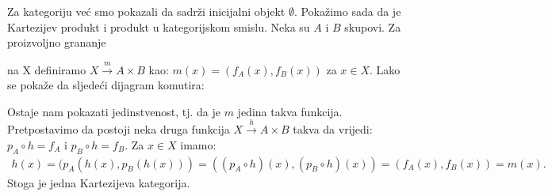 \begin{example}
    \noindent Za kategoriju  već smo pokazali da sadrži inicijalni objekt
    $\emptyset$.
    Pokažimo sada da je Kartezijev produkt i produkt u kategorijskom smislu.
    Neka su $A$ i $B$ skupovi.
    Za proizvoljno grananje
    \begin{center}
    \end{center}
    na X definiramo $X \xrightarrow{m} A \times B$ kao:
      $m(x) = (f_A(x), f_B(x))$
    za $x \in X$. Lako se pokaže da sljedeći dijagram komutira:
  \begin{center}
  \end{center}
  Ostaje nam pokazati jedinstvenost, tj. da je $m$ jedina takva funkcija.
  Pretpostavimo da postoji neka druga funkcija
    $X \xrightarrow{h} A \times B$
  takva da  vrijedi:
    $p_A \circ h = f_A$ i $p_B \circ h = f_B$.
  Za $x \in X$ imamo:
  \begin{align*}
    h(x) = (p_A(h(x), p_B(h(x))) = ((p_A \circ h )(x), (p_B \circ h)(x)) =
    (f_A(x), f_B(x)) = m(x).
  \end{align*}
  Stoga je  jedna Kartezijeva kategorija.
	\end{example}
	
